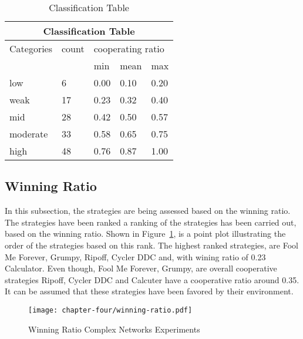 \begin{table}[!hbtp]
	\centering
	\begin{adjustbox}{width=0.4\textwidth}
		\small
		\begin{tabular}{|l|l|l|l|l|}
			\hline
			\multicolumn{5}{|c|}{Classification Table}                        \\ \hline
			Categories & count & \multicolumn{3}{l|}{cooperating ratio}        \\ \hline
			         &    & min  & mean & max  \\ \hline
			low      & 6  & 0.00 & 0.10 & 0.20 \\ \hline
			weak     & 17 & 0.23 & 0.32 & 0.40 \\ \hline
			mid      & 28 & 0.42 & 0.50 & 0.57 \\ \hline
			moderate & 33 & 0.58 & 0.65 & 0.75 \\ \hline
			high     & 48 & 0.76 & 0.87 & 1.00 \\ \hline
		\end{tabular}
	\end{adjustbox}
	\caption{Classification Table}
	\label{class}
\end{table}


\subsection{Winning Ratio}
In this subsection, the strategies are being assessed based on the winning ratio.
The strategies have been ranked   
a ranking of the strategies has been carried out, based on
the winning ratio. Shown in Figure~\ref{wining-second-gen}, is a point plot illustrating the order
of the strategies based on this rank. The highest ranked strategies, are
Fool Me Forever, Grumpy, Ripoff, Cycler DDC and, with wining ratio
of 0.23 Calculator. Even though, Fool Me Forever, Grumpy, are overall cooperative
strategies Ripoff, Cycler DDC and Calcuter have a cooperative ratio around
0.35. It can be assumed that these strategies have been favored by their environment.

\begin{figure}[!hbtp]
	\texttt{[image: chapter-four/winning-ratio.pdf]}
	\caption{Winning Ratio Complex Networks Experiments}
	\label{wining-second-gen}
\end{figure}

